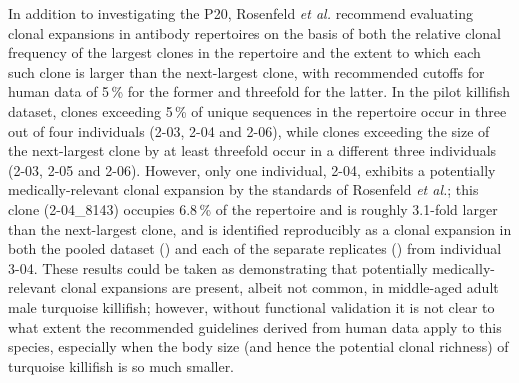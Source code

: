 In addition to investigating the P20, Rosenfeld \textit{et al.} \parencite{rosenfeld2018clonesize} recommend evaluating clonal expansions in antibody repertoires on the basis of both the relative clonal frequency of the largest clones in the repertoire and the extent to which each such clone is larger than the next-largest clone, with recommended cutoffs for human data of 5\,\% for the former and threefold for the latter. In the pilot killifish dataset, clones exceeding 5\,\% of unique sequences in the repertoire occur in three out of four individuals (2-03, 2-04 and 2-06), while clones exceeding the size of the next-largest clone by at least threefold occur in a different three individuals (2-03, 2-05 and 2-06). However, only one individual, 2-04, exhibits a potentially medically-relevant clonal expansion by the standards of Rosenfeld \textit{et al.}; this clone (2-04\_8143) occupies 6.8\,\% of the repertoire and is roughly 3.1-fold larger than the next-largest clone, and is identified reproducibly as a clonal expansion in both the pooled dataset () and each of the separate replicates () from individual 3-04. These results could be taken as demonstrating that potentially medically-relevant clonal expansions are present, albeit not common, in middle-aged adult male turquoise killifish; however, without functional validation it is not clear to what extent the recommended guidelines derived from human data apply to this species, especially when the body size (and hence the potential clonal richness) of turquoise killifish is so much smaller.

